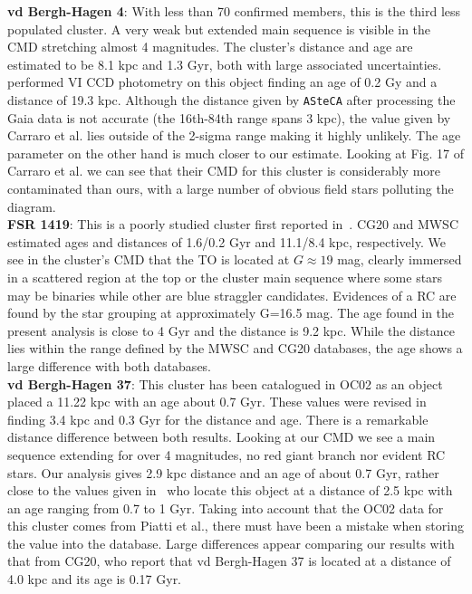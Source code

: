 \documentclass[referee]{aa}
\begin{document}
\begin{appendix}
  \noindent \textbf{vd Bergh-Hagen 4}: With less than 70 confirmed members, this is the
  third less populated cluster. A very weak but extended main sequence is
  visible in the CMD stretching almost 4 magnitudes.
  The cluster's distance and age are estimated to be 8.1 kpc and 1.3 Gyr,
  both with large associated uncertainties.
  \cite{Carraro_2007} performed VI CCD photometry on this object finding an
  age of 0.2 Gy and a distance of 19.3 kpc. Although the distance given by
  \texttt{ASteCA} after processing the Gaia data is not accurate (the 16th-84th
  range spans 3 kpc), the value given by Carraro et al. lies outside
  of the 2-sigma range making it highly unlikely. The age parameter on the other
  hand is much closer to our estimate.
  Looking at Fig. 17 of Carraro et al. we can see that their CMD for this
  cluster is considerably more contaminated than ours, with a large number of
  obvious field stars polluting the diagram.\\

  \noindent \textbf{FSR 1419}: This is a poorly studied cluster first reported
  in~\cite{Froebrich_2007}. CG20 and MWSC estimated ages and distances of
  1.6/0.2 Gyr and 11.1/8.4 kpc, respectively.
  We see in the cluster's  CMD that the TO is located at $G\approx19$ mag,
  clearly immersed in a scattered region at the top or the cluster main sequence
  where some stars may be binaries while other are blue straggler candidates.
  Evidences of a RC are found by the star grouping at approximately G=16.5 mag.
  The age found in the present analysis is close to 4 Gyr and the distance is
  9.2 kpc. While the distance lies within the range defined by the MWSC and CG20
  databases, the age shows a large difference with both databases.\\  

  \noindent \textbf{vd Bergh-Hagen 37}: This cluster has been catalogued in OC02
  as an object placed a 11.22 kpc with an age about 0.7 Gyr. These values were
  revised in~\cite{Dias_2021} finding 3.4 kpc and 0.3 Gyr for the distance and
  age. There is a remarkable distance difference between both results. 
  Looking at our CMD we see a main sequence extending for over 4 magnitudes, no
  red giant branch nor evident RC stars. Our analysis gives 2.9 kpc distance and
  an age of about 0.7 Gyr, rather close to the values given
  in~\cite{Piatti_2010} who locate this object at a distance of 2.5 kpc with an
  age ranging from 0.7 to 1 Gyr. Taking into account that the OC02 data for this
  cluster comes from Piatti et al., there must have been a mistake when storing
  the value into the database.
  Large differences appear comparing our results with that from CG20, who
  report that vd Bergh-Hagen 37 is located at a distance of 4.0 kpc and its age
  is 0.17 Gyr.\\


\end{appendix}
\end{document}
